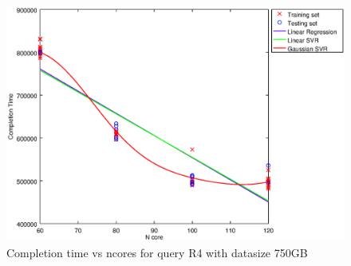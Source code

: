 
\begin {figure}[hbtp]
\centering
\includegraphics[width=\textwidth]{output/R4_750_ONLY_1_LINEAR_NCORE/plot_R4_750_bestmodels.eps}
\caption{Completion time vs ncores for query R4 with datasize 750GB}
\label{fig:only_1_linear_R4_750}
\end {figure}
